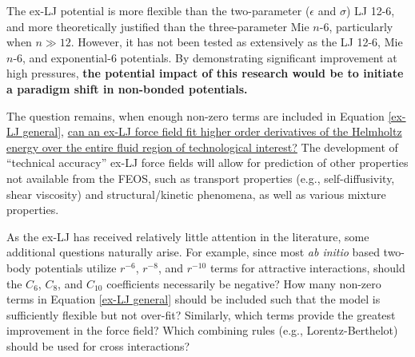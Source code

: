 \documentclass[12pt,a4paper]{article}
\begin{document}


The ex-LJ potential is more flexible than the two-parameter ($\epsilon$ and $\sigma$) LJ 12-6, and more theoretically justified than the three-parameter Mie $n$-6, particularly when $n \gg 12$. However, it has not been tested as extensively as the LJ 12-6, Mie $n$-6, and exponential-6 potentials. By demonstrating significant improvement at high pressures, \textbf{the potential impact of this research would be to initiate a paradigm shift in non-bonded potentials.}

The question remains, when enough non-zero terms are included in Equation \ref{ex-LJ general}, \ul{can an ex-LJ force field fit higher order derivatives of the Helmholtz energy over the entire fluid region of technological interest?} The development of ``technical accuracy'' ex-LJ force fields will allow for prediction of other properties not available from the FEOS, such as transport properties (e.g., self-diffusivity, shear viscosity) and structural/kinetic phenomena, as well as various mixture properties.



As the ex-LJ has received relatively little attention in the literature, some additional questions naturally arise. For example, since most \textit{ab initio} based two-body potentials utilize $r^{-6}$, $r^{-8}$, and $r^{-10}$ terms for attractive interactions, should the $C_6$, $C_8$, and $C_{10}$ coefficients necessarily be negative? How many non-zero terms in Equation \ref{ex-LJ general} should be included such that the model is sufficiently flexible but not over-fit? Similarly, which terms provide the greatest improvement in the force field? Which combining rules (e.g., Lorentz-Berthelot) should be used for cross interactions?
\end{document}

